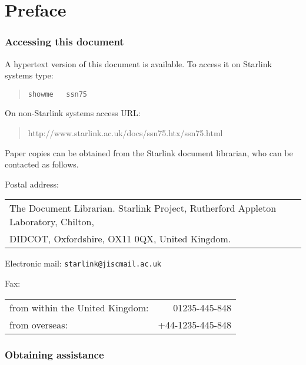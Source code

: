 \documentclass[twoside,11pt,nolof,chapters]{starlink}
\begin{document}
\scfrontmatter

\part{Preface}
\section*{Accessing this document}

A hypertext version of this document is available.  To access it on
Starlink systems type:

\begin{quote}
\texttt{showme ~ ssn75}
\end{quote}

On non-Starlink systems access URL:

\begin{quote}
{http://www.starlink.ac.uk/docs/ssn75.htx/ssn75.html}
\end{quote}

Paper copies can be obtained from the Starlink document librarian,
who can be contacted as follows.

Postal address: \\
\begin{tabular}{l}
The Document Librarian. Starlink Project, Rutherford Appleton Laboratory,
  Chilton, \\
DIDCOT, Oxfordshire, OX11 0QX, United Kingdom.                \\
\end{tabular}


Electronic mail: \texttt{starlink@jiscmail.ac.uk}


Fax: \\
\begin{tabular}{lr}
from within the United Kingdom: &    01235-445-848 \\
from overseas:                  & +44-1235-445-848 \\
\end{tabular}


\section*{Obtaining assistance}
\end{document}
